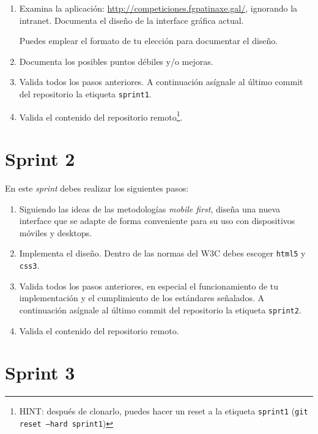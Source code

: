 \documentclass[11pt,a4paper]{article}
\begin{document}
\begin{enumerate}
\item Examina la aplicación:
  \url{http://competiciones.fgpatinaxe.gal/}, ignorando la intranet.
  Documenta el diseño de la interface gráfica actual.

  Puedes emplear el formato de tu elección para documentar el diseño.

\item Documenta los posibles puntos débiles y/o mejoras.

\item Valida todos los pasos anteriores. A continuación asígnale al
  último commit del repositorio la etiqueta \texttt{sprint1}.

\item Valida el contenido del repositorio remoto\footnote{HINT:
    después de clonarlo, puedes hacer un reset a la etiqueta
    \texttt{sprint1} (\texttt{git reset --hard sprint1})}.
\end{enumerate}


\section{Sprint 2}

En este \emph{sprint} debes realizar los siguientes pasos:

\begin{enumerate}
\item Siguiendo las ideas de las metodologías \emph{mobile first},
  diseña una nueva interface que se adapte de forma conveniente para
  su uso con dispositivos móviles y desktops.

\item Implementa el diseño. Dentro de las normas del W3C debes escoger
  \texttt{html5} y \texttt{css3}.

\item Valida todos los pasos anteriores, en especial el funcionamiento
  de tu implementación y el cumplimiento de los estándares
  señalados. A continuación asígnale al último commit del repositorio
  la etiqueta \texttt{sprint2}.

\item Valida el contenido del repositorio remoto.
\end{enumerate}


\section{Sprint 3}
\end{document}
